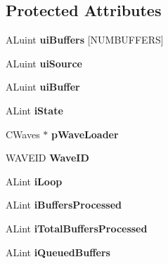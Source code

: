 \subsection*{Protected Attributes}
\begin{DoxyCompactItemize}
\item 
\mbox{\label{class_s_o_u_n_d_af29fd285dd664a2824589a6b0432c722}} 
A\+Luint {\bfseries ui\+Buffers} \mbox{[}N\+U\+M\+B\+U\+F\+F\+E\+RS\mbox{]}
\item 
\mbox{\label{class_s_o_u_n_d_a5d7967b5208477b374a3880ae26ab77a}} 
A\+Luint {\bfseries ui\+Source}
\item 
\mbox{\label{class_s_o_u_n_d_aa96a13b3b3cc7526801488789bf92cde}} 
A\+Luint {\bfseries ui\+Buffer}
\item 
\mbox{\label{class_s_o_u_n_d_a43be97d9ac6fd19cf7699ef9f5afbc70}} 
A\+Lint {\bfseries i\+State}
\item 
\mbox{\label{class_s_o_u_n_d_aa1d2c5db17651bd6cc2af4b8d076716f}} 
C\+Waves $\ast$ {\bfseries p\+Wave\+Loader}
\item 
\mbox{\label{class_s_o_u_n_d_aaf68e1f37c49cb40b7a61a4880aecebf}} 
W\+A\+V\+E\+ID {\bfseries Wave\+ID}
\item 
\mbox{\label{class_s_o_u_n_d_a2e69888846a58ab6f46dad631dedea47}} 
A\+Lint {\bfseries i\+Loop}
\item 
\mbox{\label{class_s_o_u_n_d_afef36da1f658dfe7f616c1bba79d3590}} 
A\+Lint {\bfseries i\+Buffers\+Processed}
\item 
\mbox{\label{class_s_o_u_n_d_a41a714322ff9041ccad9086d5cb01402}} 
A\+Lint {\bfseries i\+Total\+Buffers\+Processed}
\item 
\mbox{\label{class_s_o_u_n_d_aa5eef80846dd17340ba3ee615c1c7f87}} 
A\+Lint {\bfseries i\+Queued\+Buffers}
\item 
\mbox{\label{class_s_o_u_n_d_aa617757733d08fb0c90e2aee02c67ef0}} 

\end{DoxyCompactItemize}
